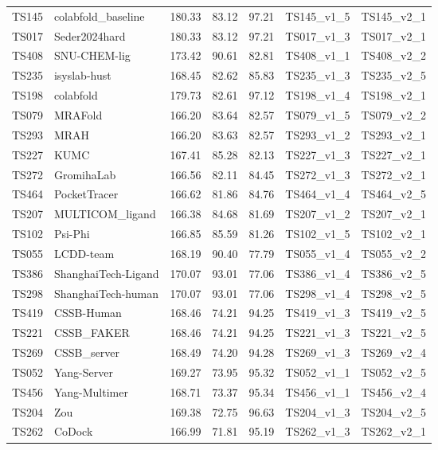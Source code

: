\begin{longtable}{lllllll}
TS145 & colabfold\_baseline & 180.33 & 83.12 & 97.21 & TS145\_v1\_5 & TS145\_v2\_1 \\ 
TS017 & Seder2024hard & 180.33 & 83.12 & 97.21 & TS017\_v1\_3 & TS017\_v2\_1 \\ 
TS408 & SNU-CHEM-lig & 173.42 & 90.61 & 82.81 & TS408\_v1\_1 & TS408\_v2\_2 \\ 
TS235 & isyslab-hust & 168.45 & 82.62 & 85.83 & TS235\_v1\_3 & TS235\_v2\_5 \\ 
TS198 & colabfold & 179.73 & 82.61 & 97.12 & TS198\_v1\_4 & TS198\_v2\_1 \\ 
TS079 & MRAFold & 166.20 & 83.64 & 82.57 & TS079\_v1\_5 & TS079\_v2\_2 \\ 
TS293 & MRAH & 166.20 & 83.63 & 82.57 & TS293\_v1\_2 & TS293\_v2\_1 \\ 
TS227 & KUMC & 167.41 & 85.28 & 82.13 & TS227\_v1\_3 & TS227\_v2\_1 \\ 
TS272 & GromihaLab & 166.56 & 82.11 & 84.45 & TS272\_v1\_3 & TS272\_v2\_1 \\ 
TS464 & PocketTracer & 166.62 & 81.86 & 84.76 & TS464\_v1\_4 & TS464\_v2\_5 \\ 
TS207 & MULTICOM\_ligand & 166.38 & 84.68 & 81.69 & TS207\_v1\_2 & TS207\_v2\_1 \\ 
TS102 & Psi-Phi & 166.85 & 85.59 & 81.26 & TS102\_v1\_5 & TS102\_v2\_1 \\ 
TS055 & LCDD-team & 168.19 & 90.40 & 77.79 & TS055\_v1\_4 & TS055\_v2\_2 \\ 
TS386 & ShanghaiTech-Ligand & 170.07 & 93.01 & 77.06 & TS386\_v1\_4 & TS386\_v2\_5 \\ 
TS298 & ShanghaiTech-human & 170.07 & 93.01 & 77.06 & TS298\_v1\_4 & TS298\_v2\_5 \\ 
TS419 & CSSB-Human & 168.46 & 74.21 & 94.25 & TS419\_v1\_3 & TS419\_v2\_5 \\ 
TS221 & CSSB\_FAKER & 168.46 & 74.21 & 94.25 & TS221\_v1\_3 & TS221\_v2\_5 \\ 
TS269 & CSSB\_server & 168.49 & 74.20 & 94.28 & TS269\_v1\_3 & TS269\_v2\_4 \\ 
TS052 & Yang-Server & 169.27 & 73.95 & 95.32 & TS052\_v1\_1 & TS052\_v2\_5 \\ 
TS456 & Yang-Multimer & 168.71 & 73.37 & 95.34 & TS456\_v1\_1 & TS456\_v2\_4 \\ 
TS204 & Zou & 169.38 & 72.75 & 96.63 & TS204\_v1\_3 & TS204\_v2\_5 \\ 
TS262 & CoDock & 166.99 & 71.81 & 95.19 & TS262\_v1\_3 & TS262\_v2\_1 \\ 

\end{longtable}
